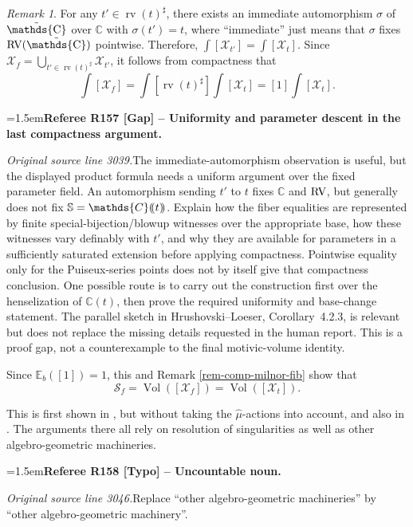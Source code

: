 \documentclass[12pt]{amsart}
\newcommand{\RefereeRemark}[4]{%
  \par\medskip\begingroup\normalfont\small\color{RefereePurple}%
  \emergencystretch=1.5em\noindent\textbf{Referee R#1 [#2] -- #3.}\par\nobreak\noindent #4\par
  \endgroup\medskip
}
\theoremstyle{plain}
\theoremstyle{definition}
\theoremstyle{remark}
\newtheorem{rem}[thm]{Remark}
\numberwithin{equation}{section}
\theoremstyle{plain}
\newcommand{\RV}{\textup{RV}}
\newcommand{\C}{\mathds{C}}
\newcommand{\0}{\emptyset}
\newcommand{\dpar}[1]{%
   (\mkern-4mu (#1 )\mkern-4mu )}
\newcommand{\mdl}[1]{\mathcal{#1}}  %
\newcommand{\bb}[1]{\mathbb{#1}}
\DeclareMathOperator{\rv}{rv}
\DeclareMathOperator{\puC}{\tilde \C}
\DeclareMathOperator{\Vol}{Vol}
\begin{document}
\begin{rem}\label{rem-comp-milnor-fib-bis}
For any $t'\in \rv(t)^\sharp$, there exists an immediate automorphism $\sigma$ of $\puC$ over $\C$ with $\sigma(t') = t$, where ``immediate'' just means that $\sigma$ fixes $\RV(\puC)$ pointwise. Therefore, $\int[\mdl X_{t'}]=\int[\mdl X_t]$. Since $\mdl X_f = \bigcup_{t'\in \rv(t)^\sharp} \mdl X_{t'}$, it follows from compactness  that
\begin{equation*}
\int [\mdl X_f] = \int [\rv(t)^\sharp] \int [\mdl X_t] =  [1]\int [\mdl X_t].
\end{equation*}

\RefereeRemark{157}{Gap}{Uniformity and parameter descent in the last compactness argument}{%
\textit{Original source line 3039.}\quad The immediate-automorphism observation is useful, but the displayed product formula needs a uniform argument over the fixed parameter field. An automorphism sending $t'$ to $t$ fixes $\C$ and $\RV$, but generally does not fix $\mathbb S=\C\dpar t$. Explain how the fiber equalities are represented by finite special-bijection/blowup witnesses over the appropriate base, how these witnesses vary definably with $t'$, and why they are available for parameters in a sufficiently saturated extension before applying compactness. Pointwise equality only for the Puiseux-series points does not by itself give that compactness conclusion. One possible route is to carry out the construction first over the henselization of $\C(t)$, then prove the required uniformity and base-change statement. The parallel sketch in Hrushovski--Loeser, Corollary~4.2.3, is relevant but does not replace the missing details requested in the human report. This is a proof gap, not a counterexample to the final motivic-volume identity.
}
Since $\bb E_b([1]) = 1 $, this and Remark \ref{rem-comp-milnor-fib} show that
\[
\mathscr S_f  = \Vol([\mdl X_f]) = \Vol([\mdl X_t]).
\]


This is first shown in \cite{nicaise_ps_tropical}, but without taking the $\hat \mu$-actions into account, and also in \cite{Nic:Pay:trop:fub, forey_virtual_2017}. The arguments there all rely on resolution of singularities as well as other algebro-geometric machineries.

\RefereeRemark{158}{Typo}{Uncountable noun}{%
\textit{Original source line 3046.}\quad Replace ``other algebro-geometric machineries'' by ``other algebro-geometric machinery''. 
}
\end{rem}
\end{document}
